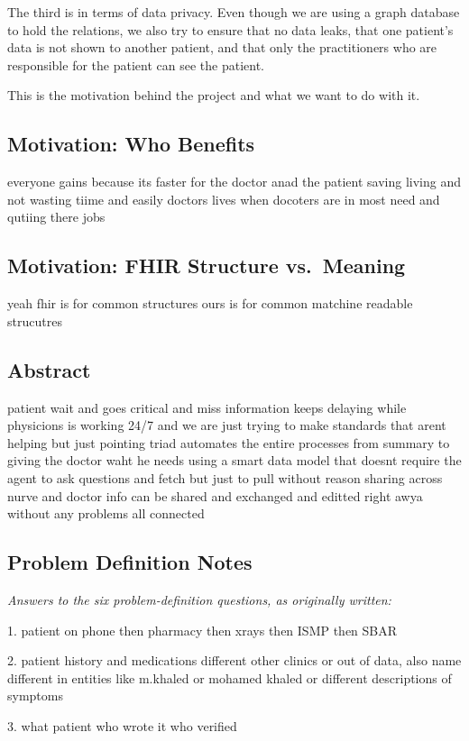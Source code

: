 \documentclass[sigconf]{acmart}
\begin{document}
The third is in terms of data privacy. Even though we are using a graph database to hold the relations, we also try to ensure that no data leaks, that one patient's data is not shown to another patient, and that only the practitioners who are responsible for the patient can see the patient.

This is the motivation behind the project and what we want to do with it.

\subsection{Motivation: Who Benefits}
everyone gains because its faster for the doctor anad the patient saving living and not wasting tiime and easily doctors lives when docoters are in most need and qutiing there jobs

\subsection{Motivation: FHIR Structure vs.\ Meaning}
yeah fhir is for common structures ours is for common matchine readable strucutres

\subsection{Abstract}
patient wait and goes critical and miss information keeps delaying while physicions is working 24/7 and we are just trying to make standards that arent helping but just pointing triad automates the entire processes from summary to giving the doctor waht he needs using a smart data model that doesnt require the agent to ask questions and fetch but just to pull without reason sharing across nurve and doctor info can be shared and exchanged and editted right awya without any problems all connected

\subsection{Problem Definition Notes}
\textit{Answers to the six problem-definition questions, as originally written:}

1. patient on phone then pharmacy then xrays then ISMP then SBAR

2. patient history and medications different other clinics or out of data, also name different in entities like m.khaled or mohamed khaled or different descriptions of symptoms

3. what patient who wrote it who verified
\end{document}
